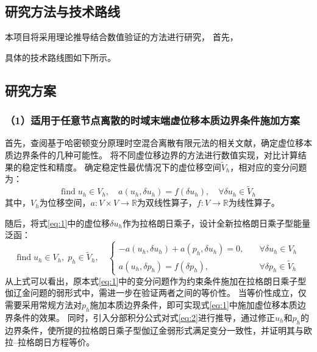 \setlength{\abovedisplayskip}{0pt}
\setlength{\belowdisplayskip}{0pt}

\subsection{研究方法与技术路线}

本项目将采用理论推导结合数值验证的方法进行研究，
首先，

具体的技术路线图如下所示。

\subsection{研究方案}

\subsubsection*{\bfseries （1）适用于任意节点离散的时域末端虚位移本质边界条件施加方案}
首先，查阅基于哈密顿变分原理时空混合离散有限元法的相关文献，确定虚位移本质边界条件的几种可能性。
将不同虚位移边界的方法进行数值实现，对比计算结果的稳定性和精度。
确定稳定性最优情况下的虚位移空间$\tilde V_h$，相对应的变分问题为：
\begin{equation}
    \text{find} \; u_h \in V_h, \quad a(u_h, \delta u_h) = f(\delta u_h), \quad \forall \delta u_h \in \tilde V_h
    \label{eq:1}
\end{equation}
其中，$V_h$为位移空间，$a:V\times V \rightarrow \mathbb R$为双线性算子，$f:V\rightarrow \mathbb R$为线性算子。

随后，将式\eqref{eq:1}中的虚位移$\delta u_h$作为拉格朗日乘子，设计全新拉格朗日乘子型能量泛函：
\begin{equation}
    \text{find} \; u_h \in V_h,\; p_h \in \tilde V_h, \quad
    \left \{
    \begin{split} 
        -a(u_h, \delta u_h) + a(p_h, \delta u_h) = 0,\quad &\forall \delta u_h \in V_h \\
        a(u_h, \delta p_h) = f(\delta p_h),\quad &\forall \delta p_h \in \tilde V_h
    \end{split}
    \right .
    \label{eq:2}
\end{equation}
从上式可以看出，原本式\eqref{eq:1}中的变分问题作为约束条件施加在拉格朗日乘子型伽辽金问题的弱形式中，需进一步在验证两者之间的等价性。
当等价性成立，仅需要采用常规方法对$p_h$施加本质边界条件，即可实现式\eqref{eq:1}中施加虚位移本质边界条件的效果。
同时，引入分部积分公式对式\eqref{eq:2}进行推导，通过修正$u_h$和$p_h$的边界条件，使所提的拉格朗日乘子型伽辽金弱形式满足变分一致性，并证明其与欧拉--拉格朗日方程等价。

